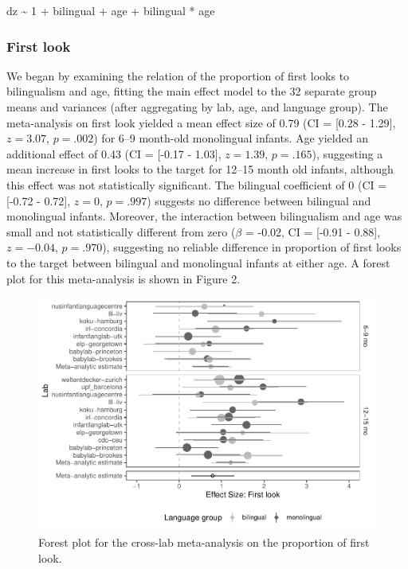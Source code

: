 \documentclass[,man,floatsintext]{apa6}
\begin{document}
dz \textasciitilde{} 1 + bilingual + age + bilingual * age

\hypertarget{first-look-1}{%
\subsubsection{First look}\label{first-look-1}}

We began by examining the relation of the proportion of first looks to bilingualism and age, fitting the main effect model to the 32 separate group means and variances (after aggregating by lab, age, and language group). The meta-analysis on first look yielded a mean effect size of 0.79 (CI = {[}0.28 - 1.29{]}, \(z = 3.07\), \(p = .002\)) for 6--9 month-old monolingual infants. Age yielded an additional effect of 0.43 (CI = {[}-0.17 - 1.03{]}, \(z = 1.39\), \(p = .165\)), suggesting a mean increase in first looks to the target for 12--15 month old infants, although this effect was not statistically significant. The bilingual coefficient of 0 (CI = {[}-0.72 - 0.72{]}, \(z = 0\), \(p = .997\)) suggests no difference between bilingual and monolingual infants. Moreover, the interaction between bilingualism and age was small and not statistically different from zero (\(\beta\) = -0.02, CI = {[}-0.91 - 0.88{]}, \(z = -0.04\), \(p = .970\)), suggesting no reliable difference in proportion of first looks to the target between bilingual and monolingual infants at either age. A forest plot for this meta-analysis is shown in Figure 2.

\begin{figure}
\centering
\includegraphics{gaze-following-paper_files/figure-latex/fig2-1.pdf}
\caption{\label{fig:fig2}Forest plot for the cross-lab meta-analysis on the proportion of first look.}
\end{figure}
\end{document}
